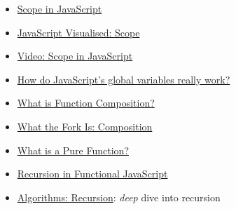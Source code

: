 \begin{itemize}[leftmargin=*]
    \item \href{https://scotch.io/tutorials/understanding-scope-in-javascript}{Scope in JavaScript}
    \item \href{https://dev.to/lydiahallie/javascript-visualized-scope-chain-13pd}{JavaScript Visualised: Scope}
    \item \href{https://www.youtube.com/watch?v=5LEuJNLfLN0}{Video: Scope in JavaScript}
    \item \href{https://2ality.com/2019/07/global-scope.html}{How do JavaScript’s global variables really work?}
    \item \href{https://medium.com/javascript-scene/master-the-javascript-interview-what-is-function-composition-20dfb109a1a0}{What is Function Composition?}
    \item \href{https://whatthefork.is/composition}{What the Fork Is: Composition}
    \item \href{https://medium.com/javascript-scene/master-the-javascript-interview-what-is-a-pure-function-d1c076bec976}{What is a Pure Function?}
    \item \href{https://www.sitepoint.com/recursion-functional-javascript/}{Recursion in Functional JavaScript}
    \item \href{http://jeffe.cs.illinois.edu/teaching/algorithms/book/01-recursion.pdf}{Algorithms: Recursion}: \textit{deep} dive into recursion
\end{itemize}
